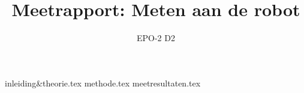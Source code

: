\documentclass{report}
\title{Meetrapport: Meten aan de robot}
\author{EPO-2 D2}
\begin{document}
\maketitle
\tableofcontents
{inleiding&theorie.tex}
{methode.tex}
{meetresultaten.tex}
\end{document}
